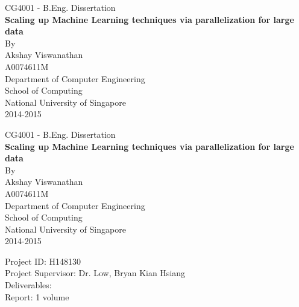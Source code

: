 \documentclass[12pt]{article}
\begin{document}
 \renewcommand{\baselinestretch}{1.50}\normalsize
\begin{titlepage}
\begin{centering}
\large
  CG4001 - B.Eng. Dissertation\\
\vspace{1 cm}
\Large \textbf{Scaling up Machine Learning techniques via parallelization for large data} \vspace{2 cm} \large \\
By \\ \vspace{.5cm}
Akshay Viswanathan \\
A0074611M \\
\vspace{2 cm} 
\vspace{5cm}
\hspace{-0.6cm}
Department of Computer Engineering\\
School of Computing\\
National University of Singapore\\
2014-2015\\
\end{centering}
\end{titlepage}
\newpage
\renewcommand{\baselinestretch}{1.50}\normalsize
\begin{titlepage}
\begin{centering}
\large
  CG4001 - B.Eng. Dissertation\\
\vspace{1 cm}
\Large \textbf{Scaling up Machine Learning techniques via parallelization for large data} \vspace{2 cm} \large \\
By \\ \vspace{.5cm}
Akshay Viswanathan \\
A0074611M \\
\vspace{4 cm}
Department of Computer Engineering\\
School of Computing\\
National University of Singapore\\
2014-2015\\
\vspace{2 cm} 
\end{centering}
\hspace{-0.6cm}Project  ID: H148130\\
Project Supervisor: Dr. Low, Bryan Kian Hsiang\\
Deliverables:\\
\-\hspace{2cm} Report: 1 volume
\end{titlepage}
\end{document}
